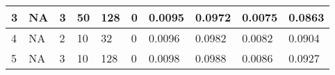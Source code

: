 \begin{table}
{\begin{tabular}{|llllllllll|}
3             & NA                                                              & 3                                                               & 50             & 128                                                            & 0                & 0.0095                                                                    & 0.0972                                                                   & 0.0075                                                               & 0.0863                                                              \\ \hline
4             & NA                                                              & 2                                                               & 10             & 32                                                             & 0                & 0.0096                                                                    & 0.0982                                                                   & 0.0082                                                               & 0.0904                                                              \\ \hline
5             & NA                                                              & 3                                                               & 10             & 128                                                            & 0                & 0.0098                                                                    & 0.0988                                                                   & 0.0086                                                               & 0.0927                                                              \\ \hline
\end{tabular}}
\end{table}

